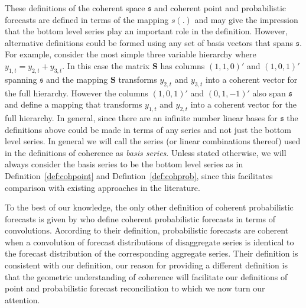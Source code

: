 \documentclass[a4paper, 11pt]{article}
\begin{document}
These definitions of the coherent space $\mathfrak{s}$ and coherent point and probabilistic forecasts are defined in terms of the mapping $s(.)$ and may give the impression that the bottom level series play an important role in the definition.  However, alternative definitions could be formed using any set of basis vectors that spans $\mathfrak{s}$. For example, consider the most simple three variable hierarchy where $y_{1,t}=y_{2,t}+y_{3,t}$.  In this case the matrix $\bm{S}$ has columns  $(1,1,0)'$ and $(1,0,1)'$ spanning $\mathfrak{s}$ and the mapping $\bm{S}$ transforms $y_{2,t}$ and $y_{3,t}$ into a coherent vector for the full hierarchy.  However the columns $(1,0,1)'$ and $(0,1,-1)'$ also span $\mathfrak{s}$ and define a mapping that transforms $y_{1,t}$ and $y_{2,t}$ into a coherent vector for the full hierarchy.  In general, since there are an infinite number linear bases for $\mathfrak{s}$ the definitions above could be made in terms of any series and not just the bottom level series.  In general we will call the series (or linear combinations thereof) used in the definitions of coherence as \textit{basis series}.  Unless stated otherwise, we will always consider the basis series to be the bottom level series as in Definition~\ref{def:cohpoint} and Defintion~\ref{def:cohprob}, since this facilitates comparison with existing approaches in the literature.


To  the best of our knowledge, the only other definition of coherent probabilistic forecasts is given by \citet{BenTaieb2017} who define coherent probabilistic forecasts in terms of convolutions. According to their definition, probabilistic forecasts are coherent when a convolution of forecast distributions of disaggregate series is identical to the forecast distribution of the corresponding aggregate series.  Their definition is consistent with our definition, our reason for providing a different definition is that the geometric understanding of coherence will facilitate our definitions of point and probabilistic forecast reconciliation to which we now turn our attention.
\end{document}
